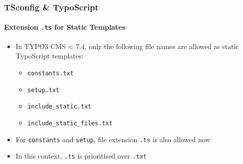 
\begin{frame}[fragile]
	\frametitle{TSconfig \& TypoScript}
	\framesubtitle{Extension \texttt{.ts} for Static Templates}

	\begin{itemize}

		\item In TYPO3 CMS < 7.4, only the following file names are allowed as static TypoScript templates:

			\begin{itemize}
				\item \texttt{constants.txt}
				\item \texttt{setup.txt}
				\item \texttt{include\_static.txt}
				\item \texttt{include\_static\_files.txt}
			\end{itemize}

		\item For \texttt{constants} and \texttt{setup}, file extension \texttt{.ts} is also allowed now

		\item In this context, \texttt{.ts} is prioritised over \texttt{.txt}

	\end{itemize}

\end{frame}


